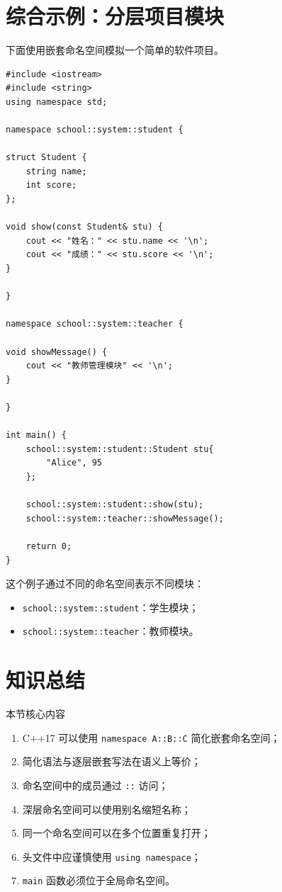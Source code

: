 \documentclass[UTF8,12pt,a4paper]{ctexart}
\begin{document}
\section{综合示例：分层项目模块}

下面使用嵌套命名空间模拟一个简单的软件项目。

\begin{lstlisting}
#include <iostream>
#include <string>
using namespace std;

namespace school::system::student {

struct Student {
    string name;
    int score;
};

void show(const Student& stu) {
    cout << "姓名：" << stu.name << '\n';
    cout << "成绩：" << stu.score << '\n';
}

}

namespace school::system::teacher {

void showMessage() {
    cout << "教师管理模块" << '\n';
}

}

int main() {
    school::system::student::Student stu{
        "Alice", 95
    };

    school::system::student::show(stu);
    school::system::teacher::showMessage();

    return 0;
}
\end{lstlisting}

这个例子通过不同的命名空间表示不同模块：

\begin{itemize}
    \item \texttt{school::system::student}：学生模块；
    \item \texttt{school::system::teacher}：教师模块。
\end{itemize}


\section{知识总结}

\begin{conceptbox}{本节核心内容}
\begin{enumerate}[label=\arabic*.]
    \item C++17 可以使用 \texttt{namespace A::B::C} 简化嵌套命名空间；
    \item 简化语法与逐层嵌套写法在语义上等价；
    \item 命名空间中的成员通过 \texttt{::} 访问；
    \item 深层命名空间可以使用别名缩短名称；
    \item 同一个命名空间可以在多个位置重复打开；
    \item 头文件中应谨慎使用 \texttt{using namespace}；
    \item \texttt{main} 函数必须位于全局命名空间。
\end{enumerate}
\end{conceptbox}
\end{document}

